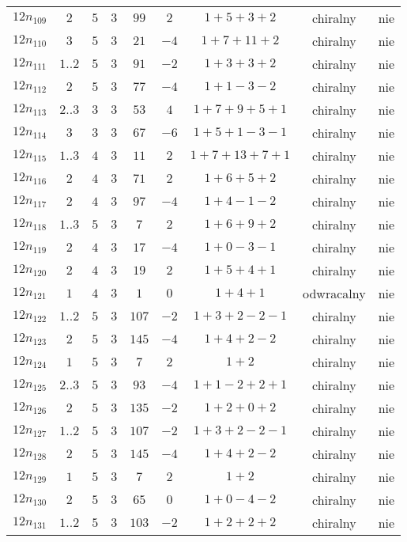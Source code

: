 \begin{longtable}{ccccccccc}
$12n_{109}$ & $2$ & $5$ & $3$ & $99$ & $2$ & $1+5+3+2$ & chiralny & nie \\
$12n_{110}$ & $3$ & $5$ & $3$ & $21$ & $-4$ & $1+7+11+2$ & chiralny & nie \\
$12n_{111}$ & $1..2$ & $5$ & $3$ & $91$ & $-2$ & $1+3+3+2$ & chiralny & nie \\
$12n_{112}$ & $2$ & $5$ & $3$ & $77$ & $-4$ & $1+1-3-2$ & chiralny & nie \\
$12n_{113}$ & $2..3$ & $3$ & $3$ & $53$ & $4$ & $1+7+9+5+1$ & chiralny & nie \\
$12n_{114}$ & $3$ & $3$ & $3$ & $67$ & $-6$ & $1+5+1-3-1$ & chiralny & nie \\
$12n_{115}$ & $1..3$ & $4$ & $3$ & $11$ & $2$ & $1+7+13+7+1$ & chiralny & nie \\
$12n_{116}$ & $2$ & $4$ & $3$ & $71$ & $2$ & $1+6+5+2$ & chiralny & nie \\
$12n_{117}$ & $2$ & $4$ & $3$ & $97$ & $-4$ & $1+4-1-2$ & chiralny & nie \\
$12n_{118}$ & $1..3$ & $5$ & $3$ & $7$ & $2$ & $1+6+9+2$ & chiralny & nie \\
$12n_{119}$ & $2$ & $4$ & $3$ & $17$ & $-4$ & $1+0-3-1$ & chiralny & nie \\
$12n_{120}$ & $2$ & $4$ & $3$ & $19$ & $2$ & $1+5+4+1$ & chiralny & nie \\
$12n_{121}$ & $1$ & $4$ & $3$ & $1$ & $0$ & $1+4+1$ & odwracalny & nie \\
$12n_{122}$ & $1..2$ & $5$ & $3$ & $107$ & $-2$ & $1+3+2-2-1$ & chiralny & nie \\
$12n_{123}$ & $2$ & $5$ & $3$ & $145$ & $-4$ & $1+4+2-2$ & chiralny & nie \\
$12n_{124}$ & $1$ & $5$ & $3$ & $7$ & $2$ & $1+2$ & chiralny & nie \\
$12n_{125}$ & $2..3$ & $5$ & $3$ & $93$ & $-4$ & $1+1-2+2+1$ & chiralny & nie \\
$12n_{126}$ & $2$ & $5$ & $3$ & $135$ & $-2$ & $1+2+0+2$ & chiralny & nie \\
$12n_{127}$ & $1..2$ & $5$ & $3$ & $107$ & $-2$ & $1+3+2-2-1$ & chiralny & nie \\
$12n_{128}$ & $2$ & $5$ & $3$ & $145$ & $-4$ & $1+4+2-2$ & chiralny & nie \\
$12n_{129}$ & $1$ & $5$ & $3$ & $7$ & $2$ & $1+2$ & chiralny & nie \\
$12n_{130}$ & $2$ & $5$ & $3$ & $65$ & $0$ & $1+0-4-2$ & chiralny & nie \\
$12n_{131}$ & $1..2$ & $5$ & $3$ & $103$ & $-2$ & $1+2+2+2$ & chiralny & nie \\

\end{longtable}
